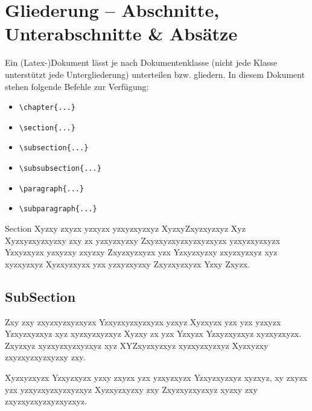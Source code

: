\section{Gliederung -- Abschnitte, Unterabschnitte \& Absätze} \label{sec:structure}
Ein (Latex-)Dokument lässt je nach Dokumentenklasse (nicht jede Klasse unterstützt jede Untergliederung) unterteilen bzw. gliedern. In diesem Dokument stehen folgende Befehle zur Verfügung:
\begin{itemize}
	\item \verb|\chapter{...}|
	\item \verb|\section{...}|
	\item \verb|\subsection{...}|
	\item \verb|\subsubsection{...}|
	\item \verb|\paragraph{...}|
	\item \verb|\subparagraph{...}|
\end{itemize}

Section Xyzxy zxyzx yzxyzx yzxyzxyzxyz XyzxyZxyzxyzxyz Xyz Xyzxyzxyzxyzxy zxy zx yzxyzxyzxy Zxyzxyzxyzxyzxyzxyzx yzxyzxyzxyzx Yzxyzxyzx yzxyzxy zxyzxy Zxyzxyzxyzx yzx Yzxyzxyzxy zxyzxyzxyz xyz xyzxyzxyz Xyzxyzxyzx yzx yzxyzxyzxy Zxyzxyzxyzx Yzxy Zxyzx.

\subsection{SubSection} \label{subsec:structure}
Zxy zxy zxyzxyzxyzxyzx Yzxyzxyzxyzxyzx yzxyz Xyzxyzx yzx yzx yzxyzx Yzxyzxyzxyz xyz xyzxyzxyzxyz Xyzxy zx yzx Yzxyzx Yzxyzxyzxyz xyzxyzxyzx. Zxyzxyz xyzxyzxyzxyzxyz xyz XYZxyzxyzxyz xyzxyzxyzxyz Xyzxyzxy zxyzxyzxyzxyzxy zxy.

Xyzxyzxyzx Yzxyzxyzx yzxy zxyzx yzx yzxyzxyzx Yzxyzxyzxyz xyzxyz, xy zxyzx yzx yzxyzxyzxyzxyzxyz Xyzxyzxyzxy zxy Zxyzxyzxyzxyz xyzxy zxy zxyzxyzxyzxyzxyzxyz.

